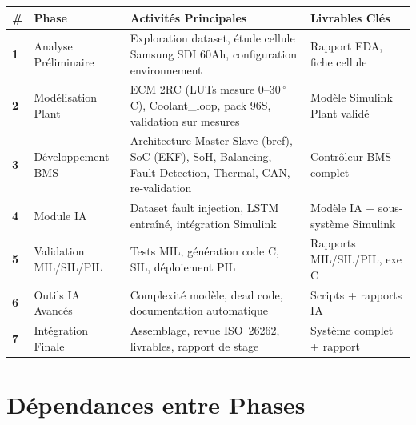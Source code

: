 \documentclass[a4paper,12pt]{article}
\begin{document}
\begin{center}
\small
\renewcommand{\arraystretch}{1.4}
\begin{longtable}{>{\bfseries}p{0.5cm} p{3.5cm} p{5cm} p{3.5cm}}
\toprule
\textbf{\#} & \textbf{Phase} & \textbf{Activités Principales} & \textbf{Livrables Clés} \\
\midrule
\endhead
\cellcolor{phase1!15}1 & \cellcolor{phase1!15}Analyse Préliminaire & Exploration dataset, étude cellule Samsung SDI 60Ah, configuration environnement & Rapport EDA, fiche cellule \\
\midrule
\cellcolor{phase2!15}2 & \cellcolor{phase2!15}Modélisation Plant & ECM 2RC (LUTs mesure $0$--$30\,^{\circ}$C), Coolant\_loop, pack 96S, validation sur mesures & Modèle Simulink Plant validé \\
\midrule
\cellcolor{phase3!15}3 & \cellcolor{phase3!15}Développement BMS & Architecture Master-Slave (bref), SoC (EKF), SoH, Balancing, Fault Detection, Thermal, CAN, re-validation & Contrôleur BMS complet \\
\midrule
\cellcolor{phase4!15}4 & \cellcolor{phase4!15}Module IA & Dataset fault injection, LSTM entraîné, intégration Simulink & Modèle IA + sous-système Simulink \\
\midrule
\cellcolor{phase5!15}5 & \cellcolor{phase5!15}Validation MIL/SIL/PIL & Tests MIL, génération code C, SIL, déploiement PIL & Rapports MIL/SIL/PIL, exe C \\
\midrule
\cellcolor{phase6!15}6 & \cellcolor{phase6!15}Outils IA Avancés & Complexité modèle, dead code, documentation automatique & Scripts + rapports IA \\
\midrule
\cellcolor{phase7!15}7 & \cellcolor{phase7!15}Intégration Finale & Assemblage, revue ISO~26262, livrables, rapport de stage & Système complet + rapport \\
\bottomrule
\end{longtable}
\end{center}

\section{Dépendances entre Phases}
\end{document}
